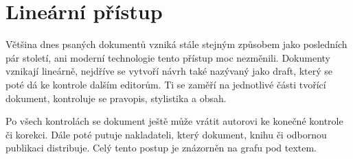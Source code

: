 \section{Lineární přístup}

Většina dnes psaných dokumentů vzniká stále stejným způsobem jako posledních pár století, ani moderní technologie tento přístup moc nezměnili.
Dokumenty vznikají lineárně, nejdříve se vytvoří návrh také nazývaný jako draft, který se poté dá ke kontrole dalším editorům. Ti se zaměří
na jednotlivé části tvořící dokument, kontroluje se pravopis, stylistika a obsah.

Po všech kontrolách se dokument ještě může vrátit autorovi ke konečné kontrole či korekci. Dále poté putuje nakladateli, který dokument,
knihu či odbornou publikaci distribuje. Celý tento postup je znázorněn na grafu pod textem.
